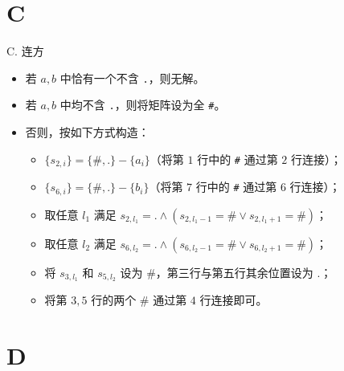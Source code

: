 \documentclass[9pt]{ctexbeamer}
\newcommand{\setParDis}{\setlength{\parskip}{6pt}}
\begin{document}
\section{C}

\begin{frame}
\setParDis

C. 连方

\begin{itemize}
	\item 若 $a,b$ 中恰有一个不含 \texttt{.}，则无解。
	\item 若 $a,b$ 中均不含 \texttt{.}，则将矩阵设为全 \texttt{\#}。
	\item 否则，按如下方式构造：
		\begin{itemize}
			\item $\{s_{2,i}\} = \{\texttt{\#}, \texttt{.}\} - \{a_i\}$（将第 $1$ 行中的 \texttt{\#} 通过第 $2$ 行连接）；
			\item $\{s_{6,i}\} = \{\texttt{\#}, \texttt{.}\} - \{b_i\}$（将第 $7$ 行中的 \texttt{\#} 通过第 $6$ 行连接）；
			\item 取任意 $l_1$ 满足 $s_{2, l_1} = \texttt{.} \land \left(s_{2, l_1 - 1} = \texttt{\#} \lor s_{2, l_1 + 1} = \texttt{\#}\right)$；
			\item 取任意 $l_2$ 满足 $s_{6, l_2} = \texttt{.} \land \left(s_{6, l_2 - 1} = \texttt{\#} \lor s_{6, l_2 + 1} = \texttt{\#}\right)$；
			\item 将 $s_{3, l_1}$ 和 $s_{5, l_2}$ 设为 $\texttt{\#}$，第三行与第五行其余位置设为 $\texttt{.}$；
			\item 将第 $3, 5$ 行的两个 $\texttt{\#}$ 通过第 $4$ 行连接即可。
		\end{itemize}
\end{itemize}

\end{frame}

\section{D}
\end{document}
